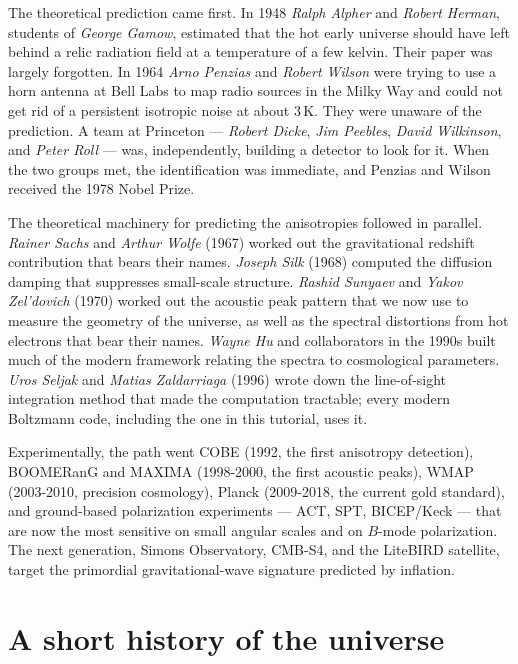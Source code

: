 The theoretical prediction came first. In 1948 \emph{Ralph Alpher} and \emph{Robert Herman}, students of \emph{George Gamow}, estimated that the hot early universe should have left behind a relic radiation field at a temperature of a few kelvin. Their paper was largely forgotten. In 1964 \emph{Arno Penzias} and \emph{Robert Wilson} were trying to use a horn antenna at Bell Labs to map radio sources in the Milky Way and could not get rid of a persistent isotropic noise at about $3\,\mathrm{K}$. They were unaware of the prediction. A team at Princeton — \emph{Robert Dicke}, \emph{Jim Peebles}, \emph{David Wilkinson}, and \emph{Peter Roll} — was, independently, building a detector to look for it. When the two groups met, the identification was immediate, and Penzias and Wilson received the 1978 Nobel Prize.

The theoretical machinery for predicting the anisotropies followed in parallel. \emph{Rainer Sachs} and \emph{Arthur Wolfe} (1967) worked out the gravitational redshift contribution that bears their names. \emph{Joseph Silk} (1968) computed the diffusion damping that suppresses small-scale structure. \emph{Rashid Sunyaev} and \emph{Yakov Zel'dovich} (1970) worked out the acoustic peak pattern that we now use to measure the geometry of the universe, as well as the spectral distortions from hot electrons that bear their names. \emph{Wayne Hu} and collaborators in the 1990s built much of the modern framework relating the spectra to cosmological parameters. \emph{Uros Seljak} and \emph{Matias Zaldarriaga} (1996) wrote down the line-of-sight integration method that made the computation tractable; every modern Boltzmann code, including the one in this tutorial, uses it.

Experimentally, the path went COBE (1992, the first anisotropy detection), BOOMERanG and MAXIMA (1998-2000, the first acoustic peaks), WMAP (2003-2010, precision cosmology), Planck (2009-2018, the current gold standard), and ground-based polarization experiments — ACT, SPT, BICEP/Keck — that are now the most sensitive on small angular scales and on $B$-mode polarization. The next generation, Simons Observatory, CMB-S4, and the LiteBIRD satellite, target the primordial gravitational-wave signature predicted by inflation.

\section*{A short history of the universe}

